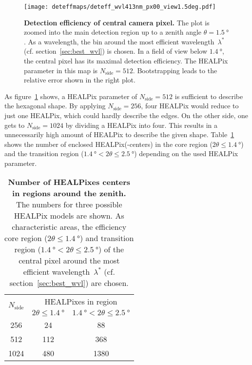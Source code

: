 \begin{figure}[H]
	\centering
	\texttt{[image: deteffmaps/deteff\_wvl413nm\_px00\_view1.5deg.pdf]}
	\caption[Detection efficiency of central camera pixel]{\textbf{Detection efficiency of central camera pixel.} The plot is zoomed into the main detection region up to a zenith angle $\theta=\SI{1.5}{\degree}$. As a wavelength, the bin around the most efficient wavelength~$\lambda^\ast$ (cf. section~\ref{sec:best_wvl}) is chosen. In a field of view below $\SI{1.4}{\degree}$, the central pixel has its maximal detection efficiency. The HEALPix parameter in this map is $N_\text{side}=\num{512}$. Bootstrapping leads to the relative error shown in the right plot.}
	\label{deteffmap:px0}
\end{figure}

As figure~\ref{deteffmap:px0} shows, a HEALPix parameter of $N_\text{side}=\num{512}$ is sufficient to describe the hexagonal shape. By applying $N_\text{side}=\num{256}$, four HEALPix would reduce to just one HEALPix, which could hardly describe the edges. On the other side, one gets to $N_\text{side}=\num{1024}$ by dividing a HEALPix into four. This results in a unnecessarily high amount of HEALPix to describe the given shape. Table~\ref{n_healpix_fov} shows the number of enclosed HEALPix(-centers) in the core region ($2\theta\leq\SI{1.4}{\degree}$) and the transition region ($\SI{1.4}{\degree} < 2\theta \leq \SI{2.5}{\degree}$) depending on the used HEALPix parameter.

\begin{table}[H]
	\centering
	\begin{tabular}{c|c|c}
		\multirow{2}{*}{$N_\text{side}$} & \multicolumn{2}{c}{HEALPixes in region} \\
		&	$2\theta\leq\SI{1.4}{\degree}$ & $\SI{1.4}{\degree} < 2\theta \leq \SI{2.5}{\degree}$ \\\hline
		\num{256}  & \num{24}  & \num{88} \\
		\num{512}  & \num{112} & \num{368} \\
		\num{1024} & \num{480} & \num{1380} \\
	\end{tabular}
	\caption[Number of HEALPixes centers in regions around the zenith]{\textbf{Number of HEALPixes centers in regions around the zenith.} The numbers for three possible HEALPix models are shown. As characteristic areas, the efficiency core region ($2\theta\leq\SI{1.4}{\degree}$) and transition region ($\SI{1.4}{\degree} < 2\theta \leq \SI{2.5}{\degree}$) of the central pixel around the most efficient wavelength~$\lambda^\ast$ (cf. section~\ref{sec:best_wvl}) are chosen.}
	\label{n_healpix_fov}
\end{table}

